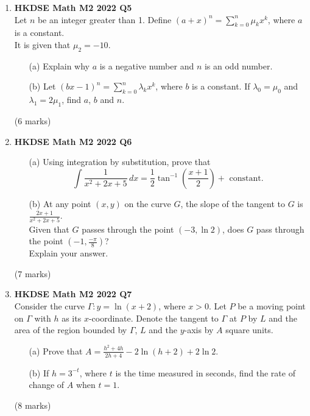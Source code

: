 \documentclass{report}
\begin{document}
\begin{enumerate}
	\item \textbf{HKDSE Math M2 2022 Q5}\\
	Let $n$ be an integer greater than 1. Define $\displaystyle (a+x)^n  = \sum_{k = 0}^{n} \mu_k x^k$, where $a$ is a constant. \\
	It is given that $\mu_2 = -10$.
	\begin{enumerate}
		\item [(a)] Explain why $a$ is a negative number and $n$ is an odd number. 
		\item [(b)] Let $\displaystyle (bx-1)^n  = \sum_{k = 0}^{n} \lambda_k x^k$, where $b$ is a constant. If $\lambda_0 = \mu_0$ and $\lambda_1 = 2\mu_1$, find $a$, $b$ and $n$.
	\end{enumerate}
	(6 marks)

	\newpage

	\item \textbf{HKDSE Math M2 2022 Q6}
	\begin{enumerate}
		\item [(a)]Using integration by substitution, prove that $$\displaystyle \int \frac{1}{x^2+2x+5}\,dx = \frac{1}{2} \tan^{-1} \left(\frac{x+1}{2}\right) +\text{ constant.}$$
		\item [(b)]At any point $(x,y)$ on the curve $G$, the slope of the tangent to $G$ is $\displaystyle \frac{2x+1}{x^2+2x+5}$.\\
		Given that $G$ passes through the point $(-3, \ln{2})$, does $G$ pass through the point $\displaystyle \left(-1, \frac{-\pi}{8}\right)$? \\
		Explain your answer.
	\end{enumerate}
	(7 marks)

	\item \textbf{HKDSE Math M2 2022 Q7}\\
	Consider the curve $\Gamma : y = \ln{(x+2)}$, where $x > 0$. Let $P$ be a moving point on $\Gamma$ with $h$ as its $x$-coordinate. Denote the tangent to $\Gamma$ at $P$ by $L$ and the area of the region bounded by $\Gamma$, $L$ and the $y$-axis by $A$ square units.
	\begin{enumerate}
		\item [(a)]Prove that $\displaystyle A = \frac{h^2+4h}{2h+4} - 2\ln{(h+2)} + 2\ln{2}$.
		\item [(b)]If $h = 3^{-t}$, where $t$ is the time measured in seconds, find the rate of change of $A$ when $t = 1$.
	\end{enumerate}
	(8 marks)


\end{enumerate}
\end{document}
